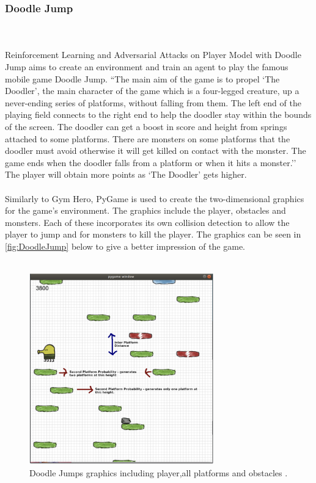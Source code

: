 \documentclass[a4paper,12pt]{article}
\begin{document}
\subsubsection{Doodle Jump}
\\\\
Reinforcement Learning and Adversarial Attacks on Player Model with Doodle Jump aims to create an environment and train an agent to play the famous mobile game Doodle Jump. ``The main aim of the game is to propel `The Doodler’, the main character of the game which is a four-legged creature, up a never-ending series of platforms, without falling from them. The left end of the playing field connects to the right end to help the doodler stay within the bounds of the screen. The doodler can get a boost in score and height from springs attached to some platforms. There are monsters on some platforms that the doodler must avoid otherwise it will get killed on contact with the monster. The game ends when the doodler falls from a platform or when it hits a monster.''\cite{DoodleJump} The player will obtain more points as `The Doodler' gets higher. 
\\\\
Similarly to Gym Hero, PyGame is used to create the two-dimensional graphics for the game's environment. The graphics include the player, obstacles and monsters. Each of these incorporates its own collision detection to allow the player to jump and for monsters to kill the player. The graphics can be seen in \autoref{fig:DoodleJump} below to give a better impression of the game. 
\\\\
\begin{figure}[H]
\centering
\includegraphics[width=8cm]{imgs/DoodleJump.png}
\caption{Doodle Jumps graphics including player,all platforms and obstacles \cite{DoodleJump}.}
\label{fig:DoodleJump}
\end{figure}\\\\
\end{document}
